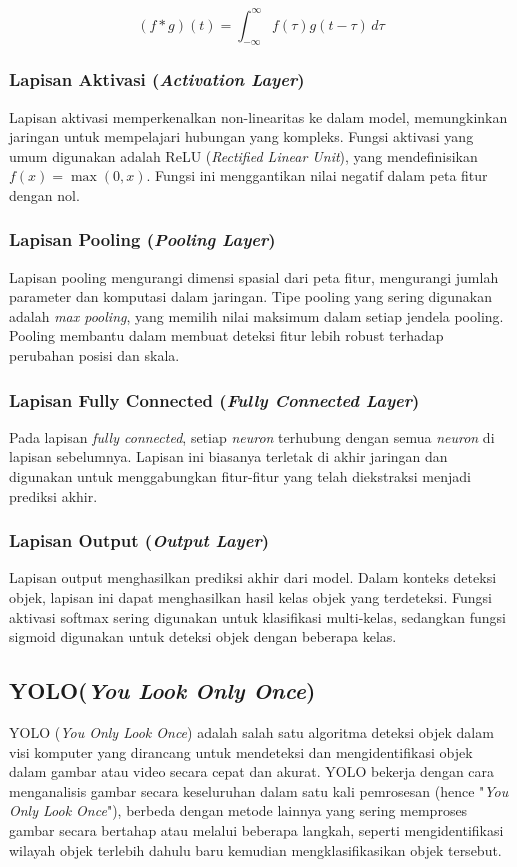 \begin{equation}
    (f * g)(t) = \int_{-\infty}^{\infty} f(\tau)g(t - \tau) \, d\tau
\end{equation}

\subsubsection{Lapisan Aktivasi (\emph{Activation Layer})}
Lapisan aktivasi memperkenalkan non-linearitas ke dalam model, memungkinkan jaringan untuk mempelajari hubungan yang kompleks. Fungsi aktivasi yang umum digunakan adalah ReLU (\emph{Rectified Linear Unit}), yang mendefinisikan \( f(x) = \max(0, x) \). Fungsi ini menggantikan nilai negatif dalam peta fitur dengan nol.

\subsubsection{Lapisan Pooling (\emph{Pooling Layer})}
Lapisan pooling mengurangi dimensi spasial dari peta fitur, mengurangi jumlah parameter dan komputasi dalam jaringan. Tipe pooling yang sering digunakan adalah \emph{max pooling}, yang memilih nilai maksimum dalam setiap jendela pooling. Pooling membantu dalam membuat deteksi fitur lebih robust terhadap perubahan posisi dan skala.

\subsubsection{Lapisan Fully Connected (\emph{Fully Connected Layer})}
Pada lapisan \emph{fully connected}, setiap \emph{neuron} terhubung dengan semua\emph{ neuron} di lapisan sebelumnya. Lapisan ini biasanya terletak di akhir jaringan dan digunakan untuk menggabungkan fitur-fitur yang telah diekstraksi menjadi prediksi akhir. 

\subsubsection{Lapisan Output (\emph{Output Layer})}
Lapisan output menghasilkan prediksi akhir dari model. Dalam konteks deteksi objek, lapisan ini dapat menghasilkan hasil kelas objek yang terdeteksi. Fungsi aktivasi softmax sering digunakan untuk klasifikasi multi-kelas, sedangkan fungsi sigmoid digunakan untuk deteksi objek dengan beberapa kelas.

\subsection{YOLO(\emph{You Look Only Once})}
YOLO (\emph{You Only Look Once}) adalah salah satu algoritma deteksi objek dalam visi komputer yang dirancang untuk mendeteksi dan mengidentifikasi objek dalam gambar atau video secara cepat dan akurat. YOLO bekerja dengan cara menganalisis gambar secara keseluruhan dalam satu kali pemrosesan (hence "\emph{You Only Look Once}"), berbeda dengan metode lainnya yang sering memproses gambar secara bertahap atau melalui beberapa langkah, seperti mengidentifikasi wilayah objek terlebih dahulu baru kemudian mengklasifikasikan objek tersebut.

